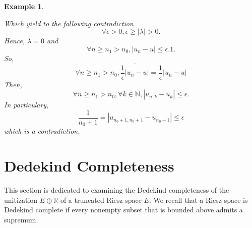 \documentclass{birkau}
\numberwithin{equation}{section}
\theoremstyle{plain}
\newtheorem{example}[theorem]{Example}
\theoremstyle{definition}
\begin{document}
\begin{example}
\begin{enumerate}
		Which yield to the following contradiction 
		\begin{equation*}
			\forall \epsilon >0,\epsilon \geq \left\vert \lambda \right\vert >0.
		\end{equation*}%
		Hence, $\lambda =0$ and 
		\begin{equation*}
			\forall n\geq n_{1}>n_{0},\left\vert u_{n}-u\right\vert \leq \epsilon .1.
		\end{equation*}%
		So, 
		\begin{equation*}
			\forall n\geq n_{1}>n_{0},\overline{\frac{1}{\epsilon }\left\vert
				u_{n}-u\right\vert }=\frac{1}{\epsilon }\left\vert u_{n}-u\right\vert 
		\end{equation*}%
		Then, 
		\begin{equation*}
			\forall n\geq n_{1}>n_{0},\forall k\in 
			\mathbb{N}
			,\left\vert u_{n,k}-u_{k}\right\vert \leq \epsilon .
		\end{equation*}%
		In particulary,%
		\begin{equation*}
			\frac{1}{n_{0}+1}=\left\vert u_{n_{0}+1,n_{0}+1}-u_{n_{0}+1}\right\vert \leq
			\epsilon 
		\end{equation*}%
		which is a contradiction.
	\end{enumerate}
\end{example}
\section{Dedekind Completeness}
This section is dedicated to examining the Dedekind completeness of the
unitization $E\oplus 
\mathbb{R}
$ of a truncated Riesz space $E$. We recall that a Riesz space is Dedekind
complete if every nonempty subset that is bounded above admits a supremum.
\end{document}

